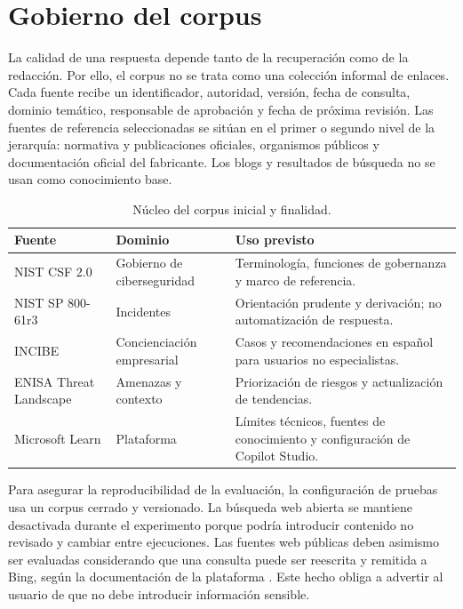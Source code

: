 \section{Gobierno del corpus}

La calidad de una respuesta depende tanto de la recuperaci\'on como de la redacci\'on. Por ello, el corpus no se trata como una colecci\'on informal de enlaces. Cada fuente recibe un identificador, autoridad, versi\'on, fecha de consulta, dominio tem\'atico, responsable de aprobaci\'on y fecha de pr\'oxima revisi\'on. Las fuentes de referencia seleccionadas se sit\'uan en el primer o segundo nivel de la jerarqu\'ia: normativa y publicaciones oficiales, organismos p\'ublicos y documentaci\'on oficial del fabricante. Los blogs y resultados de b\'usqueda no se usan como conocimiento base.

\begin{table}[H]
\centering
\small
\caption{N\'ucleo del corpus inicial y finalidad.}
\label{tab:corpus}
\begin{tabularx}{\textwidth}{p{}p{}X}
\toprule
\textbf{Fuente} & \textbf{Dominio} & \textbf{Uso previsto}\\
\midrule
NIST CSF 2.0 \cite{nistCsf2024} & Gobierno de ciberseguridad & Terminolog\'ia, funciones de gobernanza y marco de referencia.\\
NIST SP 800-61r3 \cite{nistIncident2025} & Incidentes & Orientaci\'on prudente y derivaci\'on; no automatizaci\'on de respuesta.\\
INCIBE \cite{incibeCrisis} & Concienciaci\'on empresarial & Casos y recomendaciones en espa\~nol para usuarios no especialistas.\\
ENISA Threat Landscape \cite{enisaThreat2025} & Amenazas y contexto & Priorizaci\'on de riesgos y actualizaci\'on de tendencias.\\
Microsoft Learn \cite{copilotKnowledge} & Plataforma & L\'imites t\'ecnicos, fuentes de conocimiento y configuraci\'on de Copilot Studio.\\
\bottomrule
\end{tabularx}
\end{table}

Para asegurar la reproducibilidad de la evaluaci\'on, la configuraci\'on de pruebas usa un corpus cerrado y versionado. La b\'usqueda web abierta se mantiene desactivada durante el experimento porque podr\'ia introducir contenido no revisado y cambiar entre ejecuciones. Las fuentes web p\'ublicas deben asimismo ser evaluadas considerando que una consulta puede ser reescrita y remitida a Bing, seg\'un la documentaci\'on de la plataforma \cite{copilotPublicWeb}. Este hecho obliga a advertir al usuario de que no debe introducir informaci\'on sensible.


